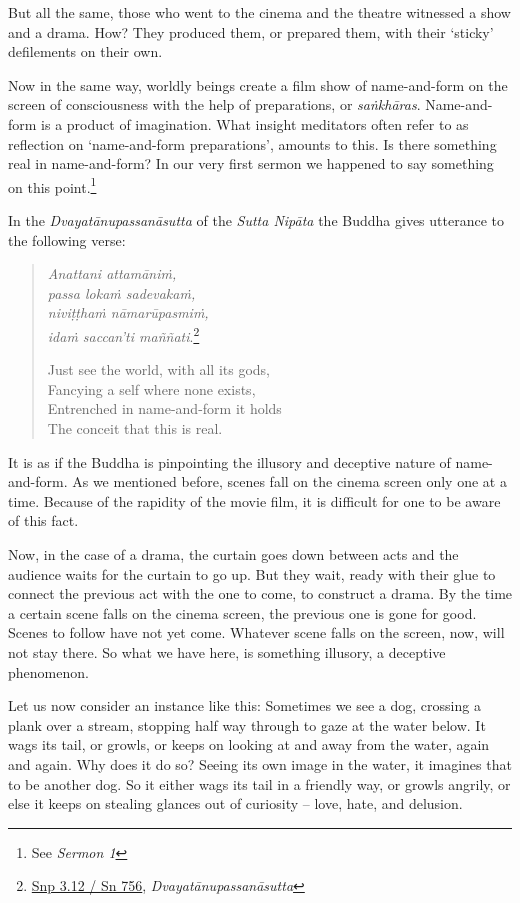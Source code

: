 But all the same, those who went to the cinema and the theatre witnessed a show and a drama. How? They produced them, or prepared them, with their `sticky' defilements on their own.

Now in the same way, worldly beings create a film show of name-and-form on the screen of consciousness with the help of preparations, or \emph{saṅkhāras}. Name-and-form is a product of imagination. What insight meditators often refer to as reflection on `name-and-form preparations', amounts to this. Is there something real in name-and-form? In our very first sermon we happened to say something on this point.\footnote{See \emph{Sermon 1}}

In the \emph{Dvayatānupassanāsutta} of the \emph{Sutta Nipāta} the Buddha gives utterance to the following verse:

\begin{quote}
\emph{Anattani attamāniṁ,}\\
\emph{passa lokaṁ sadevakaṁ,}\\
\emph{niviṭṭhaṁ nāmarūpasmiṁ,}\\
\emph{idaṁ saccan'ti maññati}.\footnote{\href{https://suttacentral.net/snp3.12/pli/ms}{Snp 3.12 / Sn 756}, \emph{Dvayatānupassanāsutta}}

Just see the world, with all its gods,\\
Fancying a self where none exists,\\
Entrenched in name-and-form it holds\\
The conceit that this is real.
\end{quote}

It is as if the Buddha is pinpointing the illusory and deceptive nature of name-and-form. As we mentioned before, scenes fall on the cinema screen only one at a time. Because of the rapidity of the movie film, it is difficult for one to be aware of this fact.

Now, in the case of a drama, the curtain goes down between acts and the audience waits for the curtain to go up. But they wait, ready with their glue to connect the previous act with the one to come, to construct a drama. By the time a certain scene falls on the cinema screen, the previous one is gone for good. Scenes to follow have not yet come. Whatever scene falls on the screen, now, will not stay there. So what we have here, is something illusory, a deceptive phenomenon.

Let us now consider an instance like this: Sometimes we see a dog, crossing a plank over a stream, stopping half way through to gaze at the water below. It wags its tail, or growls, or keeps on looking at and away from the water, again and again. Why does it do so? Seeing its own image in the water, it imagines that to be another dog. So it either wags its tail in a friendly way, or growls angrily, or else it keeps on stealing glances out of curiosity -- love, hate, and delusion.

